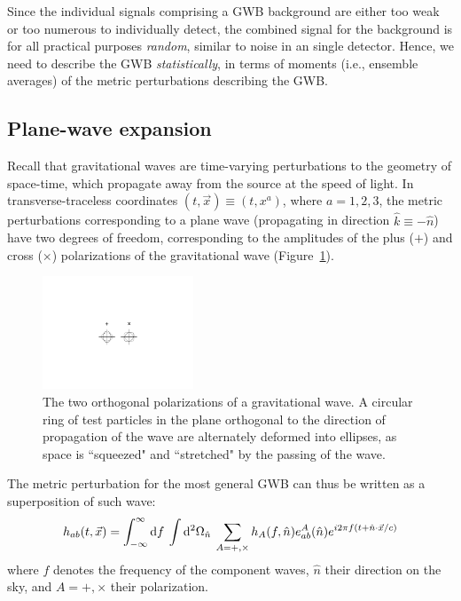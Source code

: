 \documentclass[11pt]{article}
\numberwithin{equation}{section}
\def\be{\begin{equation}}
\def\ee{\end{equation}}
\def\D{{\rm d}}
\begin{document}
Since the individual signals comprising a GWB 
background are either too weak or too numerous to 
individually detect, the combined signal for the 
background is for all practical purposes 
{\em random}, similar to noise in an single detector.
Hence, we need to describe the GWB {\em statistically}, 
in terms of moments 
(i.e., ensemble averages) of the metric perturbations 
describing the GWB.

\subsection{Plane-wave expansion}

Recall that gravitational waves are time-varying 
perturbations to the geometry of space-time, 
which propagate away from the source at the speed 
of light.
In transverse-traceless coordinates
$(t,\vec x)\equiv (t,x^a)$, where $a=1,2,3$,
the metric perturbations corresponding to a 
plane wave (propagating in direction $\hat k\equiv-\hat n$) 
have two degrees of freedom, corresponding to the 
amplitudes of the 
plus ($+$) and cross ($\times$) polarizations of
the gravitational wave (Figure~\ref{f:polarizations}).
%
\begin{figure}[htbp!]
\begin{center}
\includegraphics[width=0.4\textwidth]{Figures/polarizations}
\caption{The two orthogonal polarizations of a gravitational wave.
A circular ring of test particles in the plane orthogonal to 
the direction of propagation of the wave are alternately deformed
into ellipses, as space is ``squeezed" and ``stretched" by the 
passing of the wave.}
\label{f:polarizations}
\end{center}
\end{figure}
%
The metric perturbation for the most general GWB 
can thus be written as a superposition of such 
wave:
%
\be
h_{ab}(t,\vec x) =
\int_{-\infty}^\infty \D f\>
\int \D^2\Omega_{\hat n}\>
\sum_{A=+,\times}
h_A(f,\hat n)e^A_{ab}(\hat n) 
e^{i2\pi f(t+\hat n\cdot \vec x/c)}
\label{e:planewave}
\ee
%
where $f$ denotes the frequency of the 
component waves, $\hat n$ their direction on the
sky, and $A=+,\times$ their polarization.
\end{document}

